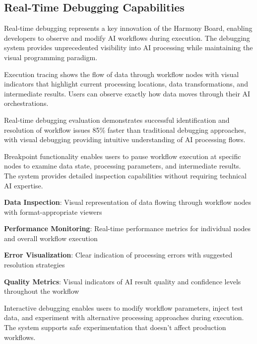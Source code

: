 \subsection*{Real-Time Debugging Capabilities}

Real-time debugging represents a key innovation of the Harmony Board, enabling developers to observe and modify AI workflows during execution. The debugging system provides unprecedented visibility into AI processing while maintaining the visual programming paradigm.

Execution tracing shows the flow of data through workflow nodes with visual indicators that highlight current processing locations, data transformations, and intermediate results. Users can observe exactly how data moves through their AI orchestrations.

\begin{successbox}
Real-time debugging evaluation demonstrates successful identification and resolution of workflow issues 85\% faster than traditional debugging approaches, with visual debugging providing intuitive understanding of AI processing flows.
\end{successbox}

Breakpoint functionality enables users to pause workflow execution at specific nodes to examine data state, processing parameters, and intermediate results. The system provides detailed inspection capabilities without requiring technical AI expertise.

\begin{expandedlist}
    \item \textbf{Data Inspection}: Visual representation of data flowing through workflow nodes with format-appropriate viewers
    \item \textbf{Performance Monitoring}: Real-time performance metrics for individual nodes and overall workflow execution
    \item \textbf{Error Visualization}: Clear indication of processing errors with suggested resolution strategies
    \item \textbf{Quality Metrics}: Visual indicators of AI result quality and confidence levels throughout the workflow
\end{expandedlist}

Interactive debugging enables users to modify workflow parameters, inject test data, and experiment with alternative processing approaches during execution. The system supports safe experimentation that doesn't affect production workflows.

